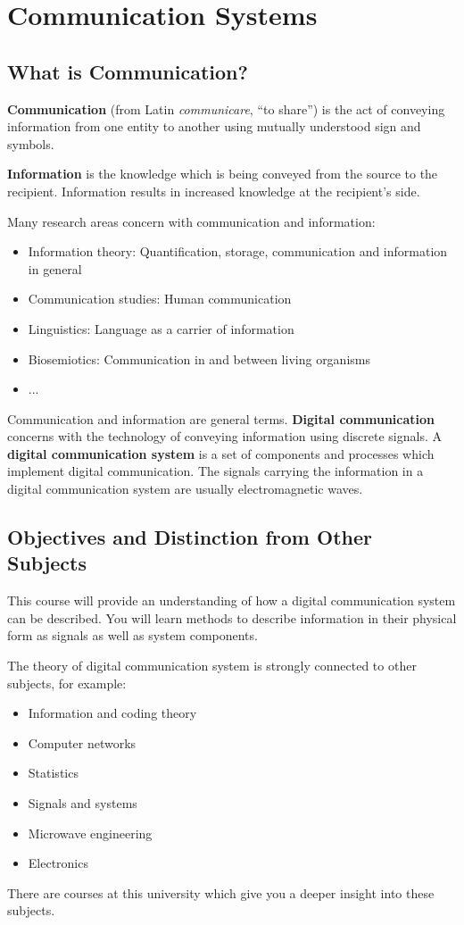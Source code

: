 \chapter{Communication Systems}

\section{What is Communication?}

\textbf{Communication} (from Latin \emph{communicare}, ``to share'') is the act of conveying information from one entity to another using mutually understood sign and symbols.

\textbf{Information} is the knowledge which is being conveyed from the source to the recipient. Information results in increased knowledge at the recipient's side.

Many research areas concern with communication and information:
\begin{itemize}
	\item Information theory: Quantification, storage, communication and information in general
	\item Communication studies: Human communication
	\item Linguistics: Language as a carrier of information
	\item Biosemiotics: Communication in and between living organisms
	\item ...
\end{itemize}

Communication and information are general terms. \textbf{Digital communication} concerns with the technology of conveying information using discrete signals. A \textbf{digital communication system} is a set of components and processes which implement digital communication. The signals carrying the information in a digital communication system are usually electromagnetic waves.


\section{Objectives and Distinction from Other Subjects}

This course will provide an understanding of how a digital communication system can be described. You will learn methods to describe information in their physical form as signals as well as system components. 

The theory of digital communication system is strongly connected to other subjects, for example:
\begin{itemize}
	\item Information and coding theory
	\item Computer networks
	\item Statistics
	\item Signals and systems
	\item Microwave engineering
	\item Electronics
\end{itemize}
There are courses at this university which give you a deeper insight into these subjects.


